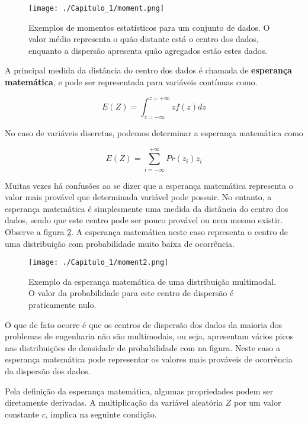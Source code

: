 \FloatBarrier
\begin{figure}[!htb]
	\centering
	\texttt{[image: ./Capitulo\_1/moment.png]}	
	\caption{Exemplos de momentos estatísticos para um conjunto de dados. O valor médio representa o quão distante está o centro dos dados, enquanto a dispersão apresenta quão agregados estão estes dados. } 
	\label{moment}
\end{figure}
\FloatBarrier

A principal medida da distância do centro dos dados é chamada de \textbf{esperança matemática}, e pode ser representada para variáveis contínuas como. 

\begin{equation}\label{eq1:Valor_esperado}
E\left(Z\right)= \int_{z = -\infty}^{z =+\infty} z f\left(z\right)dz
\end{equation}

No caso de variáveis discretas, podemos determinar a esperança matemática como 

\begin{equation}\label{eq2:Valor_esperado_discreto}
E\left(Z\right)= \sum_{i=-\infty}^{+\infty}Pr\left(z_i\right)z_i
\end{equation}

Muitas vezes há confusões ao se dizer que a esperança matemática representa o valor mais provável que determinada variável pode possuir. No entanto, a esperança matemática é simplesmente uma medida da distância do centro dos dados, sendo que este centro pode ser pouco provável ou nem mesmo existir. Observe a figura \ref{moment2}. A esperança matemática neste caso representa o centro de uma distribuição com probabilidade muito baixa de ocorrência.

\FloatBarrier
\begin{figure}[!htb]
	\centering
	\texttt{[image: ./Capitulo\_1/moment2.png]}	
	\caption{Exemplo da esperança matemática de uma distribuição multimodal. O valor da probabilidade para este centro de dispersão é praticamente nulo. } 
	\label{moment2}
\end{figure}
\FloatBarrier

O que de fato ocorre é que os centros de dispersão dos dados da maioria dos problemas de engenharia não são multimodais, ou seja, apresentam vários picos nas distribuições de densidade de probabilidade com na figura. Neste caso a esperança matemática pode representar os valores mais prováveis de ocorrência da dispersão dos dados.

Pela definição da esperança matemática, algumas propriedades podem ser diretamente derivadas. A multiplicação da variável aleatória $Z$ por um valor constante $c$, implica na seguinte condição. 

